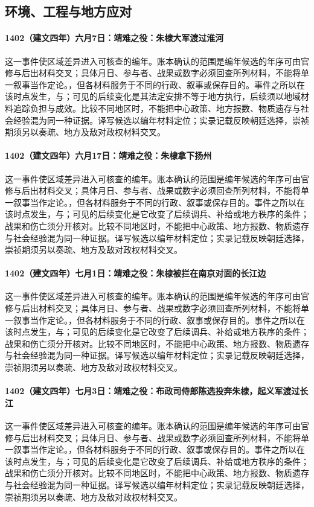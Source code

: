 \subsection{环境、工程与地方应对}

\paragraph{1402（建文四年）六月7日：靖难之役：朱棣大军渡过淮河} 这一事件使区域差异进入可核查的编年。账本确认的范围是编年候选的年序可由官修与后出材料交叉；具体月日、参与者、战果或数字必须回查所列材料，不能将单一叙事当作定论。，但各材料服务于不同的行政、叙事或保存目的。事件之所以在该时点发生，与；可见的后续变化是其法定安排不等于地方执行，后续须以地域材料追踪负担与成效。比较不同地区时，不能把中心政策、地方报数、物质遗存与社会经验混为同一种证据。译写候选以编年材料定位；实录记载反映朝廷选择，崇祯期须另以奏疏、地方及敌对政权材料交叉。

\paragraph{1402（建文四年）六月17日：靖难之役：朱棣拿下扬州} 这一事件使区域差异进入可核查的编年。账本确认的范围是编年候选的年序可由官修与后出材料交叉；具体月日、参与者、战果或数字必须回查所列材料，不能将单一叙事当作定论。，但各材料服务于不同的行政、叙事或保存目的。事件之所以在该时点发生，与；可见的后续变化是它改变了后续调兵、补给或地方秩序的条件；战果和伤亡须分开核对。比较不同地区时，不能把中心政策、地方报数、物质遗存与社会经验混为同一种证据。译写候选以编年材料定位；实录记载反映朝廷选择，崇祯期须另以奏疏、地方及敌对政权材料交叉。

\paragraph{1402（建文四年）七月1日：靖难之役：朱棣被拦在南京对面的长江边} 这一事件使区域差异进入可核查的编年。账本确认的范围是编年候选的年序可由官修与后出材料交叉；具体月日、参与者、战果或数字必须回查所列材料，不能将单一叙事当作定论。，但各材料服务于不同的行政、叙事或保存目的。事件之所以在该时点发生，与；可见的后续变化是它改变了后续调兵、补给或地方秩序的条件；战果和伤亡须分开核对。比较不同地区时，不能把中心政策、地方报数、物质遗存与社会经验混为同一种证据。译写候选以编年材料定位；实录记载反映朝廷选择，崇祯期须另以奏疏、地方及敌对政权材料交叉。

\paragraph{1402（建文四年）七月3日：靖难之役：布政司侍郎陈选投奔朱棣，起义军渡过长江} 这一事件使区域差异进入可核查的编年。账本确认的范围是编年候选的年序可由官修与后出材料交叉；具体月日、参与者、战果或数字必须回查所列材料，不能将单一叙事当作定论。，但各材料服务于不同的行政、叙事或保存目的。事件之所以在该时点发生，与；可见的后续变化是它改变了后续调兵、补给或地方秩序的条件；战果和伤亡须分开核对。比较不同地区时，不能把中心政策、地方报数、物质遗存与社会经验混为同一种证据。译写候选以编年材料定位；实录记载反映朝廷选择，崇祯期须另以奏疏、地方及敌对政权材料交叉。

